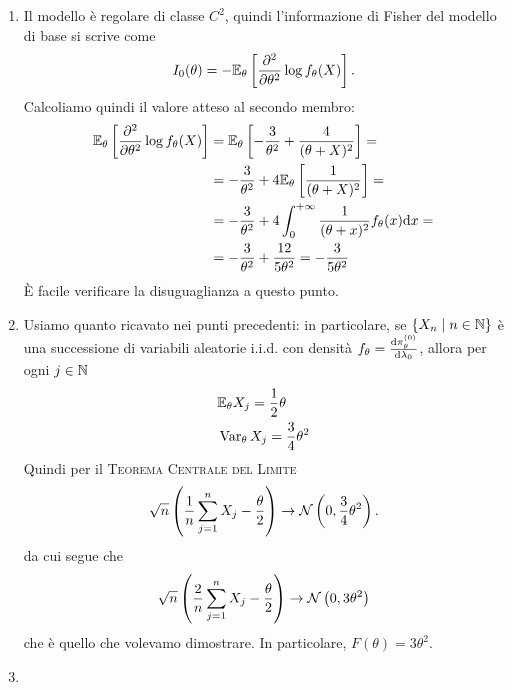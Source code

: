 \begin{soluzione}
\begin{enumerate}
  \item Il modello è regolare di classe \(C^2\), quindi l'informazione di Fisher del modello di base si scrive come
    \[
      I_0 (\theta) = - \mathbb E_\theta \left[ \frac{\partial^{2}}{\partial \theta^{2}} \log f_\theta(X) \right] .
    \]
    Calcoliamo quindi il valore atteso al secondo membro:
    \begin{align*}
      \mathbb E_\theta \left[ \frac{\partial^{2}}{\partial \theta^{2}} \log f_\theta(X) \right] &= \mathbb E_\theta \left[ -\frac{3}{\theta^2} + \frac{4}{(\theta+X)^2} \right] = \\
                                                                   &= - \frac{3}{\theta^2} + 4 \mathbb E_\theta \left[ \frac{1}{(\theta + X)^2} \right] = \\
                                                                   &= - \frac{3}{\theta^2} + 4 \int_{0}^{+\infty} \frac{1}{(\theta+x)^2} f_\theta (x) \mathrm dx = \\
                                                                   &= - \frac{3}{\theta^2} + \frac{12}{5\theta^2} = - \frac{3}{5\theta^2}
    \end{align*}
    È facile verificare la disuguaglianza a questo punto.

  \item Usiamo quanto ricavato nei punti precedenti: in particolare, se \(\{X_n \mid n \in \mathbb N\}\) è una successione di variabili aleatorie i.i.d. con densità \(f_\theta = \frac{\mathrm d \pi_\theta^{(0)}}{\mathrm d \lambda_0}\), allora per ogni \(j \in \mathbb N\)
    \begin{align*}
      & \mathbb E_\theta X_j = \frac{1}{2} \theta \\
      & \operatorname{Var}_\theta X_j = \frac{3}{4} \theta^2
    \end{align*}
    Quindi per il {\scshape Teorema Centrale del Limite}
    \[
      \sqrt n \left( \frac 1 n \sum_{j=1}^{n}X_j - \frac{\theta}{2} \right) \to \mathcal N \left(0, \frac 3 4 \theta^2\right).
    \]
    da cui segue che
    \[
      \sqrt n \left(\frac 2 n \sum_{j=1}^{n}X_j - \frac{\theta}{2} \right) \to \mathcal N \left(0, 3 \theta^2\right)
    \]
    che è quello che volevamo dimostrare. In particolare, \(F(\theta) = 3\theta^2.\)
    
  \item 
    \qedhere
  \end{enumerate}
\end{soluzione}


